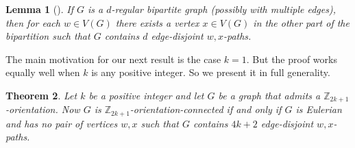 \documentclass[a4paper,12pt]{article}
\theoremstyle{plain}
\newtheorem{theorem}{Theorem}[section]
\newtheorem{lem}[theorem]{Lemma}
\theoremstyle{definition}
\newcommand{\Z}{\mathbb{Z}}
\begin{document}
\begin{lem}[\cite{YOH-MLV}]\label{bip-paths-lem}
If $G$ is a $d$-regular bipartite graph (possibly with multiple edges), then for each $w\in V(G)$ there exists a vertex $x\in V(G)$ in the other part of the bipartition such that $G$ contains $d$ edge-disjoint $w,x$-paths.
\end{lem}

The main motivation for our next result is the case $k=1$.  But the proof works equally well when $k$
is any positive integer.  So we present it in full generality.

\begin{theorem}\label{mod-ori-conn-thm}
Let $k$ be a positive integer and let $G$ be a graph that admits a $\Z_{2k+1}$-orientation. Now $G$ is $\Z_{2k+1}$-orientation-connected if and only if $G$ is Eulerian and has no pair of vertices $w,x$ such that $G$ contains $4k+2$ edge-disjoint $w,x$-paths.
\end{theorem}
\end{document}
